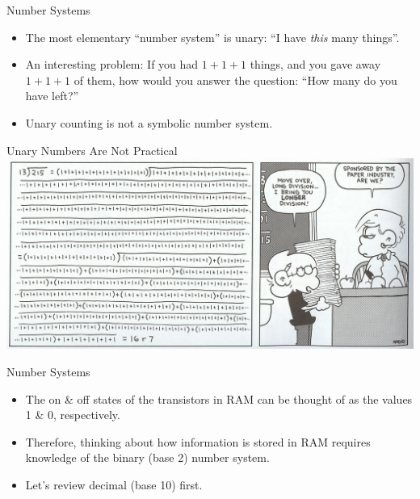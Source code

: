 \documentclass[graphics]{beamer}
\begin{document}
\begin{frame}{Number Systems}
    \begin{itemize}
        \item The most elementary ``number system'' is unary: ``I have \textit{this} many things''.
        \item An interesting problem: If you had $1+1+1$ things, and you gave away $1+1+1$ of them, how would you answer the question: ``How many do you have left?''
        \item Unary counting is not a symbolic number system.
    \end{itemize}
\end{frame}

\begin{frame}{Unary Numbers Are Not Practical}
    \includegraphics[scale=0.2]{L02_ArchNumbersSystems/L2_p22.png}
\end{frame}

\begin{frame}{Number Systems}
    \begin{itemize}
        \item The on \& off states of the transistors in RAM can be thought of as the values 1 \& 0, respectively.
        \item Therefore, thinking about how information is stored in RAM requires knowledge of the binary (base 2) number system.
        \item Let's review decimal (base 10) first.
    \end{itemize}
\end{frame}
\end{document}
